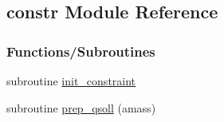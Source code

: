 \hypertarget{namespaceconstr}{}\subsection{constr Module Reference}
\label{namespaceconstr}
\subsubsection*{Functions/\+Subroutines}
\begin{DoxyCompactItemize}
\item 
subroutine \hyperlink{namespaceconstr_ad575b28fb0f6b8cd818c128e07652226}{init\+\_\+constraint}
\item 
subroutine \hyperlink{namespaceconstr_a14957f8db46b23bccfd1ae183bcc6680}{prep\+\_\+qsoll} (amass)
\end{DoxyCompactItemize}
